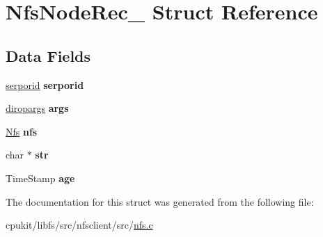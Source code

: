\hypertarget{structNfsNodeRec__}{}\section{Nfs\+Node\+Rec\+\_\+ Struct Reference}
\label{structNfsNodeRec__}
\subsection*{Data Fields}
\begin{DoxyCompactItemize}
\item 
\mbox{\label{structNfsNodeRec___a022f6e77d65d141fc6b8d70f02dad995}} 
\mbox{\hyperlink{structserporid}{serporid}} {\bfseries serporid}
\item 
\mbox{\label{structNfsNodeRec___a8b65ac810cc6cd1731d1a1e9aef94e91}} 
\mbox{\hyperlink{structdiropargs}{diropargs}} {\bfseries args}
\item 
\mbox{\label{structNfsNodeRec___a590a1f8d9096fbbeef73cd0d26e63c10}} 
\mbox{\hyperlink{structNfsRec__}{Nfs}} {\bfseries nfs}
\item 
\mbox{\label{structNfsNodeRec___a4a84d7d8606d7ad914ac7e8a22a5579e}} 
char $\ast$ {\bfseries str}
\item 
\mbox{\label{structNfsNodeRec___afc375f21689ce879972ea124d31fbfc9}} 
Time\+Stamp {\bfseries age}
\end{DoxyCompactItemize}


The documentation for this struct was generated from the following file\+:\begin{DoxyCompactItemize}
\item 
cpukit/libfs/src/nfsclient/src/\mbox{\hyperlink{nfs_8c}{nfs.\+c}}\end{DoxyCompactItemize}
